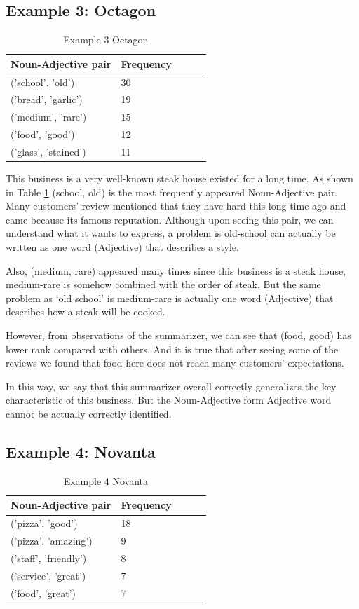 \documentclass[sigconf]{acmart}
\begin{document}
\subsection{Example 3: Octagon}
\begin{table}
  \caption{Example 3 Octagon}
  \label{tab:n_adj_3}
  \begin{tabular}{lllll}
    \toprule
    Noun-Adjective pair & Frequency \\
    \midrule
    ('school', 'old') & 30\\
    ('bread', 'garlic') & 19\\
    ('medium', 'rare') & 15\\
    ('food', 'good') & 12\\
    ('glass', 'stained') & 11\\
\end{tabular}
\end{table}

This business is a very well-known steak house existed for a long time. As shown in Table \ref{tab:n_adj_3} (school, old) is the most frequently appeared Noun-Adjective pair. Many customers’ review mentioned that they have hard this long time ago and came because its famous reputation. Although upon seeing this pair, we can understand what it wants to express, a problem is old-school can actually be written as one word (Adjective) that describes a style. 

Also, (medium, rare) appeared many times since this business is a steak house, medium-rare is somehow combined with the order of steak. But the same problem as ‘old school’ is medium-rare is actually one word (Adjective) that describes how a steak will be cooked.

However, from observations of the summarizer, we can see that (food, good) has lower rank compared with others. And it is true that after seeing some of the reviews we found that food here does not reach many customers’ expectations.

In this way, we say that this summarizer overall correctly generalizes the key characteristic of this business. But the Noun-Adjective form Adjective word cannot be actually correctly identified.

\subsection{Example 4: Novanta}
\begin{table}
  \caption{Example 4 Novanta}
  \label{tab:n_adj_4}
  \begin{tabular}{lllll}
    \toprule
    Noun-Adjective pair & Frequency \\
    \midrule
    ('pizza', 'good') & 18\\
    ('pizza', 'amazing') & 9\\
    ('staff', 'friendly') & 8\\
    ('service', 'great') & 7\\
    ('food', 'great') & 7\\
\end{tabular}
\end{table}
\end{document}
